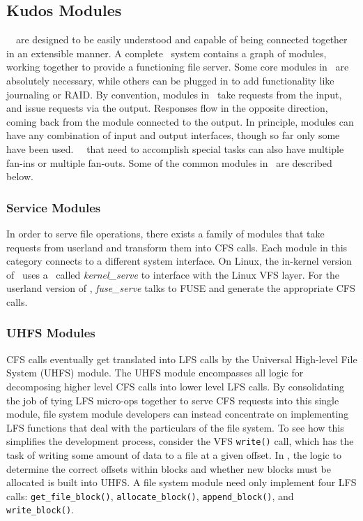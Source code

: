 \subsection{Kudos Modules}
\label{sec:modules}

\Kudos\ \modules\ are designed to be easily understood and capable of being
connected together in an extensible manner. A complete \Kudos\ system contains
a graph of modules, working together to provide a functioning file server.
Some core modules in \Kudos\ are absolutely necessary, while others can be
plugged in to add functionality like journaling or RAID. By convention,
modules in \Kudos\ take requests from the input, and issue requests via the
output. Responses flow in the opposite direction, coming back from the
module connected to the output. In principle, modules can have any
combination of input and output interfaces, though so far only some have been
used. \Kudos\ \modules\ that need to accomplish special tasks can also have
multiple fan-ins or multiple fan-outs. Some of the common modules in
\Kudos\ are described below.

\subsubsection{Service Modules}
\label{sec:modules:service}
In order to serve file operations, there exists a family of modules that take
requests from userland and transform them into CFS calls. Each module in this
category connects to a different system interface. On Linux, the in-kernel
version of \Kudos\ uses a \module\ called \emph{kernel\_serve} to interface
with the Linux VFS layer. For the userland version of \Kudos,
\emph{fuse\_serve} talks to FUSE and generate the appropriate CFS calls.

\subsubsection{UHFS Modules}
\label{sec:modules:uhfs}
CFS calls eventually get translated into LFS calls by the Universal High-level
File System (UHFS) module. The UHFS module encompasses all logic for
decomposing higher level CFS calls into lower level LFS calls. By
consolidating the job of tying LFS micro-ops together to serve CFS requests
into this single module, file system module developers can instead concentrate
on implementing LFS functions that deal with the particulars of the file
system.
To see how this simplifies the development process, consider the VFS
\texttt{write()} call, which has the task of writing some amount of data to a
file at a given offset. In \Kudos, the logic to determine the correct offsets
within blocks and whether new blocks must be allocated is built into UHFS. A
file system module need only implement four LFS calls:
\texttt{get\_file\_block()}, \texttt{allocate\_block()},
\texttt{append\_block()}, and \texttt{write\_block()}.

